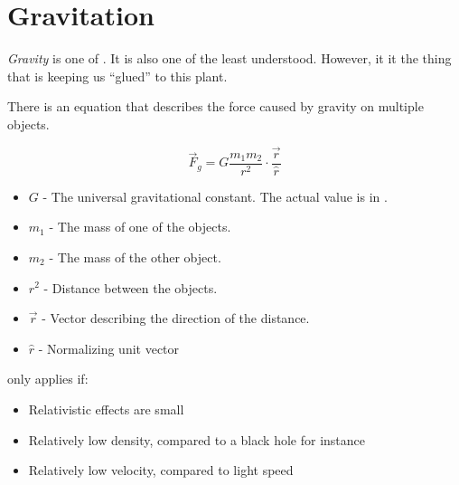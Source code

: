 \section{Gravitation} \label{sec:Gravitation}
\begin{definition}[Gravity] \label{def:Gravity}
  \emph{Gravity} is one of .
  It is also one of the least understood.
  However, it it the thing that is keeping us ``glued'' to this plant.

  There is an equation that describes the force caused by gravity on multiple objects.

  \begin{equation} \label{eq:Gravitation}
    \vec{F}_{g} = G \frac{m_{1}m_{2}}{r^{2}} \cdot \frac{\vec{r}}{\hat{r}}
  \end{equation}
  \begin{itemize}[noitemsep, nolistsep]
    \item $G$ - The universal gravitational constant. The actual value is in .
    \item $m_{1}$ - The mass of one of the objects.
    \item $m_{2}$ - The mass of the other object.
    \item $r^{2}$ - Distance between the objects.
    \item $\vec{r}$ - Vector describing the direction of the distance.
    \item $\hat{r}$ - Normalizing unit vector
  \end{itemize}

  \begin{remark}
     only applies if:
    \begin{itemize}[noitemsep, nolistsep]
      \item Relativistic effects are small
      \item Relatively low density, compared to a black hole for instance
      \item Relatively low velocity, compared to light speed
    \end{itemize}
  \end{remark}
\end{definition}

